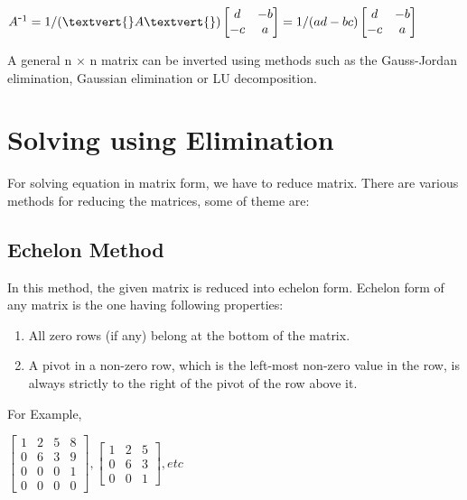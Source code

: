 \documentclass[a4paper,12pt]{article}
\begin{document}
\begin{flushleft}
\begin{flushleft}
\begin{flushleft}
$A^{\mbox{-}1}	=	1/(\textvert{}A\textvert{})  \begin{bmatrix}
 d & -b\\
 -c & a
 \end{bmatrix}	
	=	1/(ad-bc)\begin{bmatrix}
 d & -b\\
 -c & a
 \end{bmatrix}	$
\newline 

A general n $\times$ n matrix can be inverted using methods such as the Gauss-Jordan elimination, Gaussian elimination or LU decomposition.



\end{flushleft}

\section{Solving using Elimination}
\begin{flushleft}
For solving equation in matrix form, we have to reduce matrix.
\newline
There are various methods for reducing the matrices, some of theme are:
\subsection{Echelon Method}
In this method, the given matrix is reduced into echelon form.
\newline
Echelon form of any matrix is the one having following properties:
\begin{enumerate}
    \item All zero rows (if any) belong at the bottom of the matrix.
    \item A pivot in a non-zero row, which is the left-most non-zero value in the row, is always strictly to the right of the pivot of the row above it.
\end{enumerate}
\newline
    For Example,
\begin{center}
    $\begin{bmatrix}
1 & 2 & 5 & 8\\
0 & 6 & 3 & 9\\
0 & 0 & 0 & 1\\
0 & 0 & 0 & 0
\end{bmatrix}
,
\begin{bmatrix}
1 & 2 & 5 \\
0 & 6 & 3 \\
0 & 0 & 1
\end{bmatrix}
, etc$
\end{center}
\end{flushleft}


\end{flushleft}
\end{flushleft}
\end{document}
